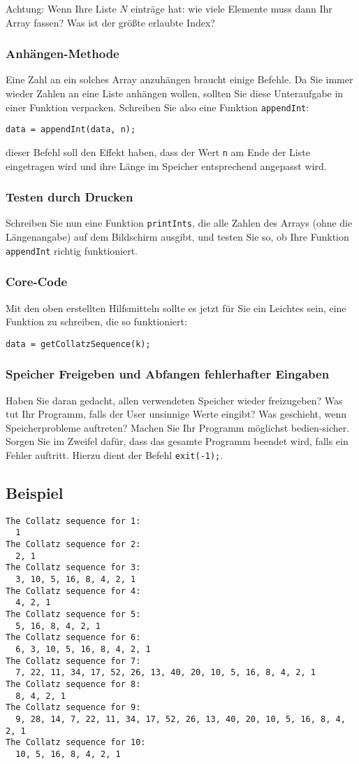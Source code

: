 \documentclass[
	ngerman,
	fontsize=10pt,
	parskip=half,
	titlepage=true,
	DIV=12
]{scrartcl}
\begin{document}
Achtung: Wenn Ihre Liste $N$ einträge hat: wie viele Elemente muss dann Ihr Array fassen? Was ist der größte erlaubte Index?

\subsubsection{Anhängen-Methode}
Eine Zahl an ein solches Array anzuhängen braucht einige Befehle. Da Sie immer wieder Zahlen an eine Liste anhängen wollen, sollten Sie diese Unteraufgabe in einer Funktion verpacken. Schreiben Sie also eine Funktion \texttt{appendInt}:

\texttt{data = appendInt(data, n);}

dieser Befehl soll den Effekt haben, dass der Wert \texttt{n} am Ende der Liste eingetragen wird und ihre Länge im Speicher entsprechend angepasst wird.

\subsubsection{Testen durch Drucken}
Schreiben Sie nun eine Funktion \texttt{printInts}, die alle Zahlen des Arrays (ohne die Längenangabe) auf dem Bildschirm ausgibt, und testen Sie so, ob Ihre Funktion \texttt{appendInt} richtig funktioniert.

\subsubsection{Core-Code}
Mit den oben erstellten Hilfsmitteln sollte es jetzt für Sie ein Leichtes sein, eine Funktion zu schreiben, die so funktioniert:

\texttt{data = getCollatzSequence(k);}

\subsubsection{Speicher Freigeben und Abfangen fehlerhafter Eingaben}
Haben Sie daran gedacht, allen verwendeten Speicher wieder freizugeben? Was tut Ihr Programm, falls der User unsinnige Werte eingibt? Was geschieht, wenn Speicherprobleme auftreten? Machen Sie Ihr Programm möglichst bedien-sicher. Sorgen Sie im Zweifel dafür, dass das gesamte Programm beendet wird, falls ein Fehler auftritt. Hierzu dient der Befehl \texttt{exit(-1);}.

\subsection{Beispiel}
\begin{verbatim}
The Collatz sequence for 1:
  1
The Collatz sequence for 2:
  2, 1
The Collatz sequence for 3:
  3, 10, 5, 16, 8, 4, 2, 1
The Collatz sequence for 4:
  4, 2, 1
The Collatz sequence for 5:
  5, 16, 8, 4, 2, 1
The Collatz sequence for 6:
  6, 3, 10, 5, 16, 8, 4, 2, 1
The Collatz sequence for 7:
  7, 22, 11, 34, 17, 52, 26, 13, 40, 20, 10, 5, 16, 8, 4, 2, 1
The Collatz sequence for 8:
  8, 4, 2, 1
The Collatz sequence for 9:
  9, 28, 14, 7, 22, 11, 34, 17, 52, 26, 13, 40, 20, 10, 5, 16, 8, 4, 2, 1
The Collatz sequence for 10:
  10, 5, 16, 8, 4, 2, 1
\end{verbatim}
\end{document}
